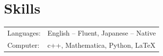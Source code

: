 \documentclass[12pt]{article}
\begin{document}
\section*{Skills}
\begin{table}[H]
  \begin{tabular}{lp{6in}}
    Languages: & English -- Fluent, Japanese -- Native \\
    Computer: & c++, Mathematica, Python, LaTeX
  \end{tabular}
\end{table}
\end{document}
